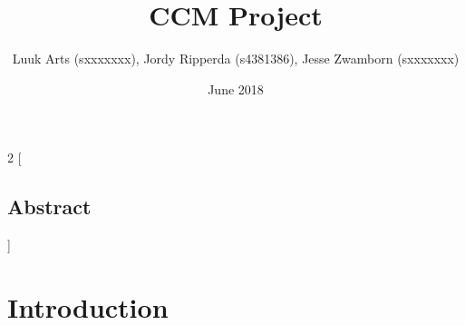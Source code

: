 \documentclass[11pt]{article}
\title{CCM Project}
\author{Luuk Arts (sxxxxxxx), Jordy Ripperda (s4381386), Jesse Zwamborn (sxxxxxxx)}
\date{June 2018}
\begin{document}
\begin{multicols}{2}
[\maketitle
\begin{center}
    \section{Abstract}
\end{center}
\blindtext
]

\section{Introduction}
\lipsum


\end{multicols}
\end{document}
